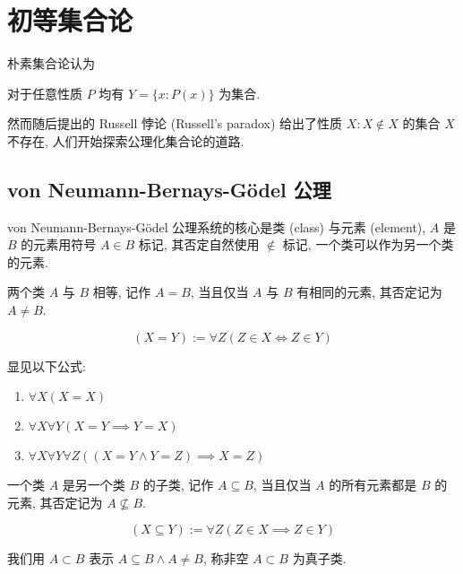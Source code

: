 \section{初等集合论}

朴素集合论认为

\begin{axiom}
    对于任意性质 \(P\) 均有 \(Y = \{x : P(x)\}\) 为集合.
\end{axiom}

然而随后提出的 Russell 悖论 (Russell's paradox) 给出了性质 \(X: X \notin X\) 的集合 \(X\) 不存在, 人们开始探索公理化集合论的道路. 

\subsection{von Neumann-Bernays-Gödel 公理}

von Neumann-Bernays-Gödel 公理系统的核心是类 (class) 与元素 (element), \(A\) 是 \(B\) 的元素用符号 \(A \in B\) 标记,
其否定自然使用 \(\notin\) 标记, 一个类可以作为另一个类的元素.

\begin{definition}
    两个类 \(A\) 与 \(B\) 相等, 记作 \(A = B\), 当且仅当 \(A\) 与 \(B\) 有相同的元素, 其否定记为 \(A \neq B\).

    \[
        (X = Y) := \forall Z (Z \in X \iff Z \in Y)
    \]
\end{definition}

\begin{corollary}
    显见以下公式:

    \begin{enumerate}
        \item \(\forall X (X = X)\)
        \item \(\forall X \forall Y (X = Y \implies Y = X)\)
        \item \(\forall X \forall Y \forall Z ((X = Y \land Y = Z) \implies X = Z)\)
    \end{enumerate}
\end{corollary}

\begin{definition}
    一个类 \(A\) 是另一个类 \(B\) 的子类, 记作 \(A \subseteq B\), 当且仅当 \(A\) 的所有元素都是 \(B\) 的元素, 其否定记为 \(A \nsubseteq B\).

    \[
        (X \subseteq Y) := \forall Z (Z \in X \implies Z \in Y)
    \]

    我们用 \(A \subset B\) 表示 \(A \subseteq B \land A \neq B\), 称非空 \(A \subset B\) 为真子类.
\end{definition}

